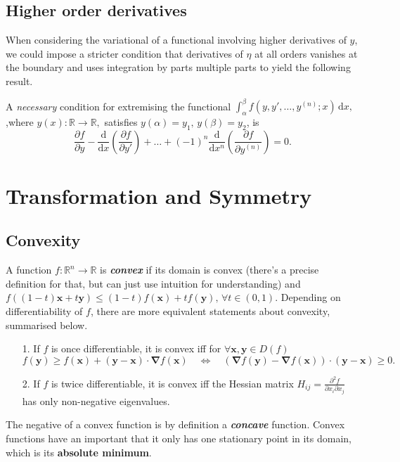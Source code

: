 \documentclass{article}
\theoremstyle{nonumberplain}
\begin{document}
\subsection{Higher order derivatives}
When considering the variational of a functional involving higher derivatives of $y$, we could impose a stricter  condition that derivatives of $\eta $ at all orders vanishes at the boundary and uses integration by parts multiple parts to yield the following result. 
\begin{frm-res}
    A \textit{necessary} condition for extremising the functional 
    \(
        \int_{\alpha }^{\beta } f(y,y',\ldots ,y^{(n)}  ; x ) \,\mathrm{d}x, 
    \) 
    ,where $y(x)
        \colon \mathbb{R} \to \mathbb{R},
    $ satisfies $y(\alpha ) = y_1, \, y(\beta ) = y_2$,
    is
    \[
        \frac{\partial f}{\partial y} - 
        \frac{\mathrm{d}}{\mathrm{d}x} \left(\frac{\partial f}{\partial y' } \right)
        + \ldots  + (-1)^n \frac{\mathrm{d}}{\mathrm{d}x^n} \left(\frac{\partial f}{\partial y^{(n)}} \right)  
        =0.
    \]
\end{frm-res}

\section{Transformation and Symmetry}
\subsection{Convexity}
A function $f 
    \colon \mathbb{R}^n \to \mathbb{R}
$ is \textit{\textbf{convex}}  if its domain is convex (there's a precise definition for that, but can just use intuition for understanding) and $f((1-t)\mathbf{x} + t \mathbf{y} ) \leq  (1-t) f(\mathbf{x} ) + t f(\mathbf{y} ), \, \forall t \in (0,1).$ Depending on differentiability of $f$, there are more equivalent statements about convexity, summarised below. 
\begin{frm-res}
    \quad 
    \begin{itemize}
        \item[1.] If $f$ is once differentiable, it is convex iff for $\forall \mathbf{x} , \mathbf{y} \in D(f)$
        \[
            f(\mathbf{y} ) \geq  f(\mathbf{x} ) + (\mathbf{y}  - \mathbf{x} ) \cdot \mathbf{\nabla} f(\mathbf{x} )
            \quad \Leftrightarrow \quad 
            (\mathbf{\nabla} f(\mathbf{y} ) - \mathbf{\nabla} f(\mathbf{x} )) \cdot (\mathbf{y} - \mathbf{x} ) \geq 0.  
        \]
        \item[2.] If $f$ is twice differentiable, it is convex iff the Hessian matrix $H_{ij} = \frac{\partial^2   f}{\partial x_i \partial x_j} $ has only non-negative eigenvalues. 
    \end{itemize}
\end{frm-res}
The negative of a convex function is by definition a \textit{\textbf{concave}}  function. Convex functions have an important that it only has one stationary point in its domain, which is its \textbf{absolute minimum}.  
\end{document}
